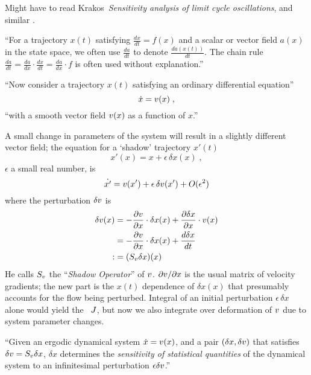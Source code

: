 \begin{description}
Might have to read Krakos\etal\
\emph{Sensitivity analysis of limit cycle oscillations},
and similar .

                                    \toCB
``For a trajectory $x(t)$ satisfying $\frac{dx}{dt} = f(x)$ and a
scalar or vector field $a(x)$ in the state space, we often use
$\frac{da}{dt}$ to denote $\frac{da(x(t))}{dt}$.  The chain rule
$\frac{da}{dt} = \frac{da}{dx}\cdot \frac{dx}{dt} =
\frac{da}{dx}\cdot f$ is often used without explanation.''

``Now consider a trajectory $x(t)$ satisfying an ordinary differential
equation''
\begin{equation}\label{Wang13:ode}
\dot{x} = v(x) \;,
\end{equation}
``with a smooth vector field $v(x)$ as a function of $x$.''

A small change in parameters of the system will result in a slightly
different vector field; the equation for a `shadow' trajectory $x'(t)$
\begin{equation} \label{Wang13:wrap0}
x'(x) = x + \epsilon\, \delta x(x) \;,
\end{equation}
$\epsilon$ a small real number,
is
\begin{equation}\label{Wang13:dfode}
\dot{x'} = v(x') + \epsilon\, \delta v(x') + O(\epsilon^2)
\end{equation}
where the perturbation $\delta v$ is
\begin{equation}\label{Wang13:Sf}
\begin{split}
\delta v(x) &= -\frac{\partial v}{\partial x} \cdot \delta x(x)
             + \frac{\partial \delta x}{\partial x} \cdot v(x)  \\
            &= -\frac{\partial v}{\partial x} \cdot \delta x(x)
             + \frac{d \delta x}{dt}\\
           :&= (S_{v} \delta x)(x)
\end{split}
\end{equation}
He calls $S_{v}$ the ``{\em Shadow Operator}'' of $v$. ${\partial
v}/{\partial x}$ is the usual matrix of velocity gradients; the
new part is the $x(t)$ dependence of $\delta x(x)$ that presumably
accounts for the flow being perturbed. Integral of an initial
perturbation $\epsilon\,\delta x$ alone would yield the \JacobianM\
$J$, but now we also integrate over deformation of $v$ due to
system parameter changes.

``Given an ergodic dynamical system $\dot{x} = v(x)$, and a pair
$(\delta x, \delta v)$ that satisfies $\delta v =
S_{v} \delta x$, $\delta x$ determines the {\em sensitivity of
statistical quantities} of the dynamical system to an infinitesimal
perturbation $\epsilon\delta v$.''


\end{description}
